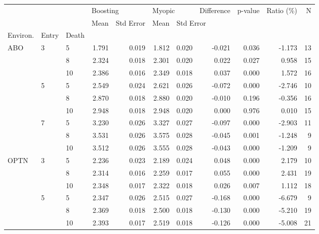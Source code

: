 \begin{tabular}{lllrrrrrrrr}
\toprule
    &   &    & \multicolumn{2}{l}{Boosting} & \multicolumn{2}{l}{Myopic} & Difference & p-value & Ratio (\%) &   N \\
    &   &    &     Mean & Std Error &   Mean & \multicolumn{5}{l}{Std Error} \\
Environ. & Entry & Death &          &           &        &           &            &         &           &     \\
\midrule
ABO & 3 & 5  &    1.791 &     0.019 &  1.812 &     0.020 &     -0.021 &   0.036 &    -1.173 &  13 \\
    &   & 8  &    2.324 &     0.018 &  2.301 &     0.020 &      0.022 &   0.027 &     0.958 &  15 \\
    &   & 10 &    2.386 &     0.016 &  2.349 &     0.018 &      0.037 &   0.000 &     1.572 &  16 \\
    & 5 & 5  &    2.549 &     0.024 &  2.621 &     0.026 &     -0.072 &   0.000 &    -2.746 &  10 \\
    &   & 8  &    2.870 &     0.018 &  2.880 &     0.020 &     -0.010 &   0.196 &    -0.356 &  16 \\
    &   & 10 &    2.948 &     0.018 &  2.948 &     0.020 &      0.000 &   0.976 &     0.010 &  15 \\
    & 7 & 5  &    3.230 &     0.026 &  3.327 &     0.027 &     -0.097 &   0.000 &    -2.903 &  11 \\
    &   & 8  &    3.531 &     0.026 &  3.575 &     0.028 &     -0.045 &   0.001 &    -1.248 &   9 \\
    &   & 10 &    3.512 &     0.026 &  3.555 &     0.028 &     -0.043 &   0.000 &    -1.209 &   9 \\
OPTN & 3 & 5  &    2.236 &     0.023 &  2.189 &     0.024 &      0.048 &   0.000 &     2.179 &  10 \\
    &   & 8  &    2.314 &     0.016 &  2.259 &     0.017 &      0.055 &   0.000 &     2.431 &  19 \\
    &   & 10 &    2.348 &     0.017 &  2.322 &     0.018 &      0.026 &   0.007 &     1.112 &  18 \\
    & 5 & 5  &    2.347 &     0.026 &  2.515 &     0.027 &     -0.168 &   0.000 &    -6.679 &   9 \\
    &   & 8  &    2.369 &     0.018 &  2.500 &     0.018 &     -0.130 &   0.000 &    -5.210 &  19 \\
    &   & 10 &    2.393 &     0.017 &  2.519 &     0.018 &     -0.126 &   0.000 &    -5.008 &  21 \\

\end{tabular}
